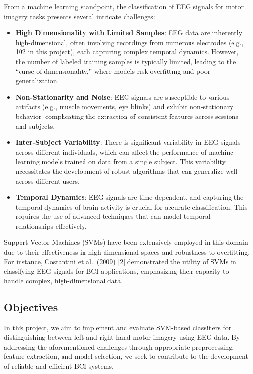 \documentclass[
  letterpaper,
  DIV=11,
  numbers=noendperiod]{scrartcl}
\providecommand{\tightlist}{%
  \setlength{\itemsep}{0pt}\setlength{\parskip}{0pt}}\usepackage{longtable,booktabs,array}
\begin{document}
From a machine learning standpoint, the classification of EEG signals
for motor imagery tasks presents several intricate challenges:

\begin{itemize}
\tightlist
\item
  \textbf{High Dimensionality with Limited Samples}: EEG data are
  inherently high-dimensional, often involving recordings from numerous
  electrodes (e.g., 102 in this project), each capturing complex
  temporal dynamics. However, the number of labeled training samples is
  typically limited, leading to the ``curse of dimensionality,'' where
  models risk overfitting and poor generalization.
\item
  \textbf{Non-Stationarity and Noise}: EEG signals are susceptible to
  various artifacts (e.g., muscle movements, eye blinks) and exhibit
  non-stationary behavior, complicating the extraction of consistent
  features across sessions and subjects.
\item
  \textbf{Inter-Subject Variability}: There is significant variability
  in EEG signals across different individuals, which can affect the
  performance of machine learning models trained on data from a single
  subject. This variability necessitates the development of robust
  algorithms that can generalize well across different users.
\item
  \textbf{Temporal Dynamics}: EEG signals are time-dependent, and
  capturing the temporal dynamics of brain activity is crucial for
  accurate classification. This requires the use of advanced techniques
  that can model temporal relationships effectively.
\end{itemize}

Support Vector Machines (SVMs) have been extensively employed in this
domain due to their effectiveness in high-dimensional spaces and
robustness to overfitting. For instance, Costantini et al.~(2009)
{[}2{]} demonstrated the utility of SVMs in classifying EEG signals for
BCI applications, emphasizing their capacity to handle complex,
high-dimensional data.

\subsection{Objectives}\label{objectives}

In this project, we aim to implement and evaluate SVM-based classifiers
for distinguishing between left and right-hand motor imagery using EEG
data. By addressing the aforementioned challenges through appropriate
preprocessing, feature extraction, and model selection, we seek to
contribute to the development of reliable and efficient BCI systems.
\end{document}
